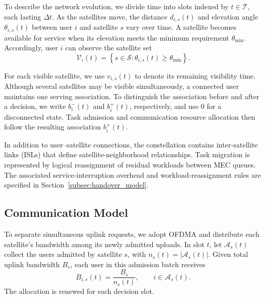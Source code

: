 \documentclass[journal]{IEEEtran}
\begin{document}
To describe the network evolution, we divide time into
slots indexed by $t\in\mathcal{T}$, each lasting $\Delta t$.
As the satellites move, the distance $d_{i,s}(t)$ and
elevation angle $\theta_{i,s}(t)$ between user $i$ and
satellite $s$ vary over time. A satellite becomes available
for service when its elevation meets the minimum requirement
$\theta_{\min}$. Accordingly, user $i$ can observe the
satellite set
\begin{equation}
\mathcal{V}_i(t)=
\left\{s\in\mathcal{S}:
\theta_{i,s}(t)\geq\theta_{\min}\right\}.
\label{eq:visible_set}
\end{equation}

For each visible satellite, we use $v_{i,s}(t)$ to denote
its remaining visibility time. Although several satellites
may be visible simultaneously, a connected user maintains
one serving association. To distinguish the association
before and after a decision, we write $b_i^{-}(t)$ and
$b_i^{+}(t)$, respectively, and use $0$ for a disconnected
state. Task admission and communication resource allocation
then follow the resulting association $b_i^{+}(t)$.

In addition to user--satellite connections, the constellation
contains inter-satellite links (ISLs) that define
satellite-neighborhood relationships.
Task migration is represented by logical reassignment
of residual workloads between MEC queues.
The associated service-interruption overhead and
workload-reassignment rules are specified in
Section~\ref{subsec:handover_model}.

\subsection{Communication Model}
\label{subsec:communication_model}

To separate simultaneous uplink requests, we adopt OFDMA
and distribute each satellite's bandwidth among its newly
admitted uploads. In slot $t$, let $\mathcal{A}_s(t)$
collect the users admitted by satellite $s$, with
$n_s(t)=|\mathcal{A}_s(t)|$. Given total uplink bandwidth
$B_s$, each user in this admission batch receives
\begin{equation}
B_{i,s}(t)=\frac{B_s}{n_s(t)},
\qquad i\in\mathcal{A}_s(t).
\label{eq:bandwidth_sharing}
\end{equation}
The allocation is renewed for each decision slot.
\end{document}
